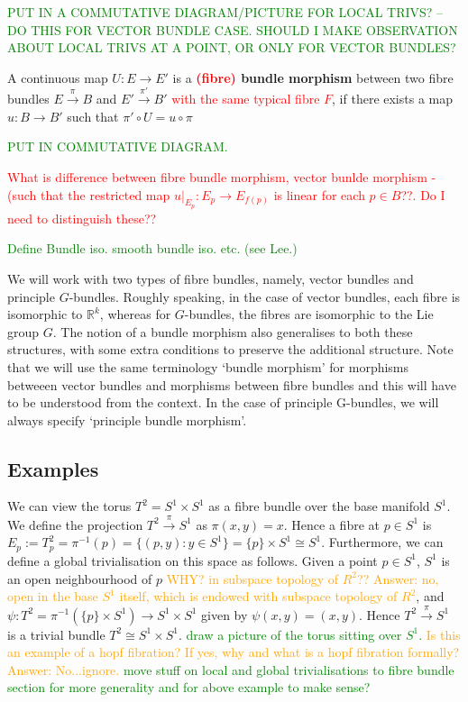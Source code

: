 \documentclass[a4paper]{article}
\theoremstyle{definition} \newtheorem*{definition}{Definition}
\theoremstyle{definition} \newtheorem*{definitions}{Definitions}
\theoremstyle{plain} \newtheorem{theorem}{Theorem}[section]
\theoremstyle{plain} \newtheorem{proposition}[theorem]{Proposition}
\theoremstyle{plain} \newtheorem{corollary}[theorem]{Corollary}
\theoremstyle{plain} \newtheorem{lemma}[theorem]{Lemma}
\theoremstyle{plain} \newtheorem{example}[theorem]{Example}
\newcommand{\checkCorrect}[1]{\textcolor{red}{#1}}
\newcommand{\question}[1]{\textcolor{orange}{#1}}
\newcommand{\finish}[1]{\textcolor{green}{#1}}
\newcommand{\defn}[1]{\textbf{#1}}
\newcommand{\realnos}{\mathbb{R}}
\begin{document}
\finish{PUT IN A COMMUTATIVE DIAGRAM/PICTURE FOR LOCAL TRIVS? -- DO THIS FOR VECTOR BUNDLE CASE. SHOULD I MAKE OBSERVATION ABOUT LOCAL TRIVS AT A POINT, OR ONLY FOR VECTOR BUNDLES?}

A continuous map $U:E\rightarrow E'$ is a \defn{\checkCorrect{(fibre)} bundle morphism} between two fibre bundles $E\xrightarrow{\pi} B$ and $E'\xrightarrow{\pi'} B'$ \checkCorrect{with the same typical fibre $F$}, if there exists a map $u:B\rightarrow B'$ such that $\pi' \circ U = u \circ \pi$

\finish{PUT IN COMMUTATIVE DIAGRAM.}

\checkCorrect{What is difference between fibre bundle morphism, vector bunlde morphism - (such that the restricted map $u\vert_{E_p}: E_p \rightarrow E_{f(p)}$ is linear for each $p\in B$??. Do I need to distinguish these??}

\finish{Define Bundle iso. smooth bundle iso. etc. (see Lee.)}

We will work with two types of fibre bundles, namely, vector bundles and principle $G$-bundles. Roughly speaking, in the case of vector bundles, each fibre is isomorphic to $\realnos^k$, whereas for $G$-bundles, the fibres are isomorphic to the Lie group $G$. The notion of a bundle morphism also generalises to both these structures, with some extra conditions to preserve the additional structure. Note that we will use the same terminology `bundle morphism' for morphisms betweeen vector bundles and morphisms between fibre bundles and this will have to be understood from the context. In the case of principle G-bundles, we will always specify `principle bundle morphism'.

\subsection{Examples}
We can view the torus $T^2=S^1\times S^1$ as a fibre bundle over the base manifold $S^1$. We define the projection $T^2 \xrightarrow{\pi} S^1$ as $\pi(x, y)=x$. Hence a fibre at $p\in S^1$ is $E_p := T^2_p = \pi^{-1}(p) = \{(p, y): y\in S^1\} = \{p\}\times S^1 \cong S^1$. Furthermore, we can define a global trivialisation on this space as follows. Given a point $p\in S^1$, $S^1$ is an open neighbourhood of $p$ \question{WHY? in subspace topology of $R^2$?? Answer: no, open in the base $S^1$ itself, which is endowed with subspace topology of $R^2$}, and $\psi:T^2=\pi^{-1}(\{p\}\times S^1)\to S^1 \times S^1$ given by $\psi(x, y)=(x, y)$. Hence $T^2 \xrightarrow{\pi} S^1$ is a trivial bundle $T^2\cong S^1\times S^1$. 
\finish{draw a picture of the torus sitting over $S^1$.} \question{Is this an example of a hopf fibration? If yes, why and what is a hopf fibration formally? Answer: No...ignore.}
\finish{move stuff on local and global trivialisations to fibre bundle section for more generality and for above example to make sense?}
\end{document}
